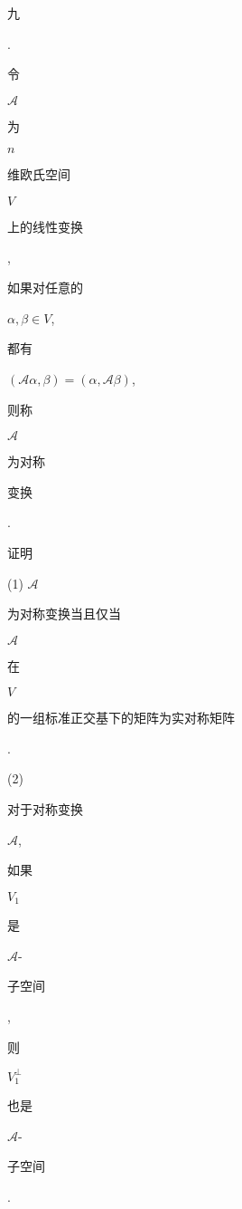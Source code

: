 \documentclass[10pt]{article}
\begin{document}
\begin{CJK}{UTF8}{mj}九\end{CJK}. \begin{CJK}{UTF8}{mj}令\end{CJK} $\mathscr{A}$ \begin{CJK}{UTF8}{mj}为\end{CJK} $n$ \begin{CJK}{UTF8}{mj}维欧氏空间\end{CJK} $V$ \begin{CJK}{UTF8}{mj}上的线性变换\end{CJK}, \begin{CJK}{UTF8}{mj}如果对任意的\end{CJK} $\alpha, \beta \in V$, \begin{CJK}{UTF8}{mj}都有\end{CJK} $(\mathscr{A} \alpha, \beta)=(\alpha, \mathscr{A} \beta)$, \begin{CJK}{UTF8}{mj}则称\end{CJK} $\mathscr{A}$ \begin{CJK}{UTF8}{mj}为对称\end{CJK} \begin{CJK}{UTF8}{mj}变换\end{CJK}. \begin{CJK}{UTF8}{mj}证明\end{CJK}

(1) $\mathscr{A}$ \begin{CJK}{UTF8}{mj}为对称变换当且仅当\end{CJK} $\mathscr{A}$ \begin{CJK}{UTF8}{mj}在\end{CJK} $V$ \begin{CJK}{UTF8}{mj}的一组标准正交基下的矩阵为实对称矩阵\end{CJK}.

(2) \begin{CJK}{UTF8}{mj}对于对称变换\end{CJK} $\mathscr{A}$, \begin{CJK}{UTF8}{mj}如果\end{CJK} $V_{1}$ \begin{CJK}{UTF8}{mj}是\end{CJK} $\mathscr{A}$-\begin{CJK}{UTF8}{mj}子空间\end{CJK}, \begin{CJK}{UTF8}{mj}则\end{CJK} $V_{1}^{\perp}$ \begin{CJK}{UTF8}{mj}也是\end{CJK} $\mathscr{A}$-\begin{CJK}{UTF8}{mj}子空间\end{CJK}.
\end{document}
